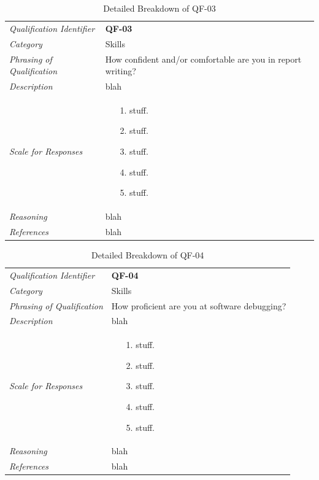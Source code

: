 \documentclass[12pt,letterpaper]{article}
\begin{document}
\begin{table}[H]
	\caption{Detailed Breakdown of QF-03}
	\begin{tabu} to 
		\toprule
		Qualification Identifier & {\bf QF-03}\\
		Category & Skills \\
		Phrasing of Qualification & How confident and/or comfortable are you in report writing? \\
		Description & blah\\
		Scale for Responses &
		\begin{minipage}[t]{\linewidth}
			\begin{enumerate}
				\item[1.] stuff.
				\item[2.] stuff.
				\item[3.] stuff.
				\item[4.] stuff.
				\item[5.] stuff.
			\end{enumerate}
		\end{minipage}\\
		Reasoning & blah\\
		References & blah\\
		\toprule
	\end{tabu}
\end{table}

\begin{table}[H]
	\caption{Detailed Breakdown of QF-04}
	\begin{tabu} to 
		\toprule
		Qualification Identifier & {\bf QF-04}\\
		Category & Skills \\
		Phrasing of Qualification & How proficient are you at software debugging? \\
		Description & blah\\
		Scale for Responses &
		\begin{minipage}[t]{\linewidth}
			\begin{enumerate}
				\item[1.] stuff.
				\item[2.] stuff.
				\item[3.] stuff.
				\item[4.] stuff.
				\item[5.] stuff.
			\end{enumerate}
		\end{minipage}\\
		Reasoning & blah\\
		References & blah\\
		\toprule
	\end{tabu}
\end{table}
\end{document}
